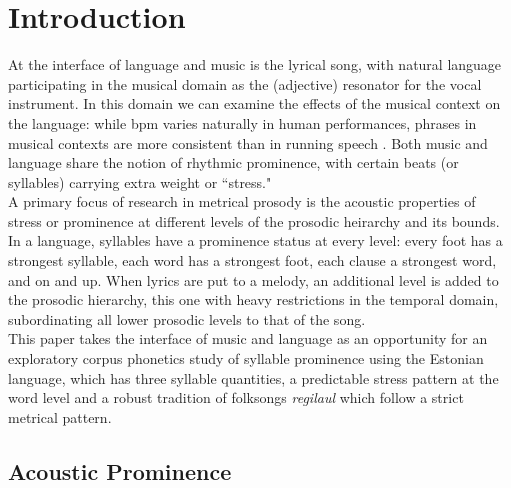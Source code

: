 \documentclass[11pt]{article}
\begin{document}
  \section*{Introduction}

At the interface of language and music is the lyrical song, with natural language participating in the musical domain as the (adjective) resonator for the vocal instrument. In this domain we can examine the effects of the musical context on the language: while bpm varies naturally in human performances, phrases in musical contexts are more consistent than in running speech \cite{}. Both music and language share the notion of rhythmic prominence, with certain beats (or syllables) carrying extra weight or ``stress."  \\

A primary focus of research in metrical prosody is the acoustic properties of stress or prominence at different levels of the prosodic heirarchy and its bounds. In a language, syllables have a prominence status at every level: every foot has a strongest syllable, each word has a strongest foot, each clause a strongest word, and on and up. When lyrics are put to a melody, an additional level is added to the prosodic hierarchy, this one with heavy restrictions in the temporal domain, subordinating all lower prosodic levels to that of the song. \\

This paper takes the interface of music and language as an opportunity for an exploratory corpus phonetics study of syllable prominence using the Estonian language, which has three syllable quantities, a predictable stress pattern at the word level and a robust tradition of folksongs {\it regilaul} which follow a strict metrical pattern. \\

\subsection*{Acoustic Prominence} 
 
\end{document}
